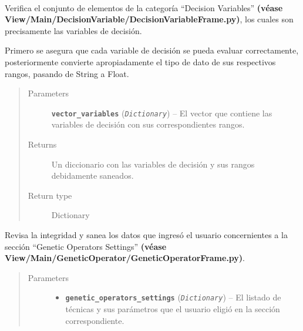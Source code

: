 \documentclass[letterpaper,10pt,english]{sphinxmanual}
\begin{document}
\begin{fulllineitems}
\begin{fulllineitems}
\label{Controller/Verifier:Controller.Verifier.Verifier.sanitize_decision_variables}~
\begin{DUlineblock}{0em}
\item[] Verifica el conjunto de elementos de la categoría ``Decision Variables''
\textbf{(véase View/Main/DecisionVariable/DecisionVariableFrame.py)}, los cuales
son precisamente las variables de decisión.
\item[] Primero se asegura que cada variable de decisión se pueda evaluar
correctamente, posteriormente convierte apropiadamente el tipo
de dato de sus respectivos rangos, pasando de String a Float.
\end{DUlineblock}
\begin{quote}\begin{description}
\item[{Parameters}] \leavevmode
\textbf{\texttt{vector\_variables}} (\emph{\texttt{Dictionary}}) -- El vector que contiene las variables de 
decisión con sus correspondientes rangos.

\item[{Returns}] \leavevmode
Un diccionario con las variables de decisión y sus 
rangos debidamente saneados.

\item[{Return type}] \leavevmode
Dictionary

\end{description}\end{quote}

\end{fulllineitems}


\begin{fulllineitems}
\label{Controller/Verifier:Controller.Verifier.Verifier.sanitize_genetic_operators_settings}
Revisa la integridad y sanea los datos que ingresó el usuario 
concernientes a la sección ``Genetic Operators Settings''
\textbf{(véase View/Main/GeneticOperator/GeneticOperatorFrame.py)}.
\begin{quote}\begin{description}
\item[{Parameters}] \leavevmode\begin{itemize}
\item {} 
\textbf{\texttt{genetic\_operators\_settings}} (\emph{\texttt{Dictionary}}) -- El listado de técnicas y sus parámetros que el usuario
eligió en la sección correspondiente.


\end{itemize}
\end{description}
\end{quote}
\end{fulllineitems}
\end{fulllineitems}
\end{document}
